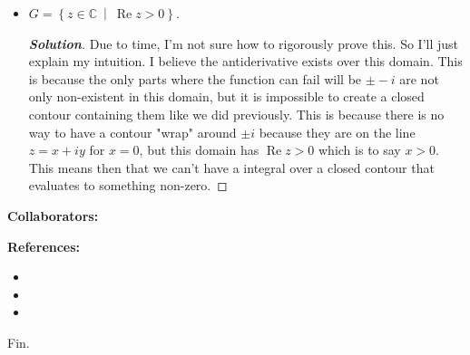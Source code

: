 \documentclass[11pt]{article}
\newenvironment{problem}[2][Problem\!]{\begin{trivlist}
\item[\hskip \labelsep {\bfseries #1}\hskip \labelsep {\bfseries #2}]}{\end{trivlist}}
\newenvironment{solution}{\begin{proof}[\textbf{\textit{Solution}}] }{\end{proof}}
\newcommand{\cc}{\mathbb C}   %
\newcommand{\setp}[2]{\left\{#1\ \middle|\ #2\right\}} %
\renewcommand{\Re}{\operatorname{Re}}
\begin{document}
\begin{problem}{7.5}
\begin{itemize}[itemsep=3em]
\item[(b)] $G = \setp{z \in \cc}{\Re z > 0}$.
\begin{solution}
  Due to time, I'm not sure how to rigorously prove this. So I'll just explain my intuition. I believe the antiderivative exists over this domain. This is because the only parts where the function can fail will be $\pm-i$ are not only non-existent in this domain, but it is impossible to create a closed contour containing them like we did previously. This is because there is no way to have a contour "wrap" around $\pm i$ because they are on the line $z = x + i y$ for $x = 0$, but this domain has $\Re z > 0$ which is to say $x > 0 $. This means then that we can't have a integral over a closed contour that evaluates to something non-zero. 
\end{solution}

\end{itemize}
\end{problem}


\newpage  %

\begin{center}
\textbf{Collaborators:}
\end{center}
\vfill 

\begin{center}
\textbf{References:}
\end{center}
\begin{itemize}
\item[$\bullet$] [Book(s): Title, Author]
\item[$\bullet$] [Online: \href{http://example.com/}{\color{blue}Link}]
\item[$\bullet$] [Notes: \href{http://example.com/}{\color{blue}Link}]
\end{itemize}

\vfill
\begin{center}
Fin.
\end{center}
\vfill
\end{document}
